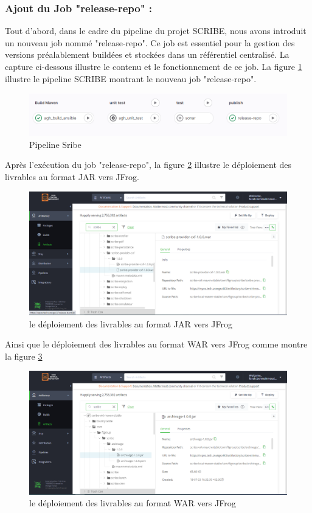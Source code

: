 { \subsubsection{Ajout du Job "release-repo" :}
 Tout d'abord, dans le cadre du pipeline du projet SCRIBE, nous avons introduit un nouveau job nommé "release-repo". Ce job est essentiel pour la gestion des versions préalablement buildées et stockées dans un référentiel centralisé. La capture ci-dessous illustre le contenu et le fonctionnement de ce job.
La figure \ref{pipeline Scribe} illustre le pipeline SCRIBE montrant le nouveau job "release-repo".
\begin{figure}[H]
    \centering\includegraphics[scale=0.55]{img/pipeline Scribe.PNG}
    \caption{Pipeline Sribe }
    \label{pipeline Scribe}
 \end{figure}
Après l'exécution du job "release-repo", la figure \ref{jar} illustre le déploiement des livrables au format JAR vers JFrog.
\begin{figure}[H]
    \centering\includegraphics[scale=0.4]{img/frog_jar.PNG}
    \caption{le déploiement des livrables au format JAR vers JFrog}
    \label{jar}
 \end{figure}
 \newpage
Ainsi que le déploiement des livrables au format WAR vers JFrog comme montre la figure \ref{warr}

 \begin{figure}[H]
    \centering\includegraphics[scale=0.4]{img/jfrog_war.PNG}
    \caption{le déploiement des livrables au format WAR vers JFrog}
    \label{warr}
 \end{figure}
}
